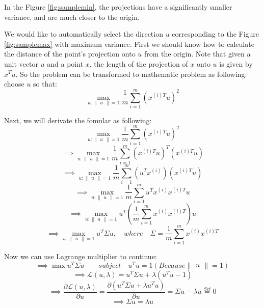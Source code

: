 \documentclass[a4paper]{article}
\begin{document}
In the Figure \ref{fig:samplemin}, the projections have a significantly smaller variance, and are much closer to the origin.

We would like to automatically select the direction $u$ corresponding to the Figure \ref{fig:samplemax} with maximum variance.  First we should know how to calculate the distance of the point's projection onto $u$ from the origin. Note that given a unit vector $u$ and a point $x$, the length of the projection of $x$ onto $u$ is given by $x^{T}u$. So the problem can be transformed to mathematic problem as following: choose $u$ so that:
$$
	\max_{u:\begin{Vmatrix}u\end{Vmatrix}=1} \frac{1}{m} \sum_{i=1}^{m}(x^{(i)T}u)^{2}
$$

Next, we will derivate the fomular as following:
$$
	\max_{u:\begin{Vmatrix}u\end{Vmatrix}=1} \frac{1}{m} \sum_{i=1}^{m}(x^{(i)T}u)^{2}
$$
$$
	\implies \max_{u:\begin{Vmatrix}u\end{Vmatrix}=1} \frac{1}{m} \sum_{i=1}^{m}(x^{(i)T}u)^{T}(x^{(i)T}u)
$$
$$
	\implies \max_{u:\begin{Vmatrix}u\end{Vmatrix}=1} \frac{1}{m} \sum_{i=1}^{m}(u^Tx^{(i)})(x^{(i)T}u)
$$
$$
	\implies \max_{u:\begin{Vmatrix}u\end{Vmatrix}=1} \frac{1}{m} \sum_{i=1}^{m}u^Tx^{(i)}x^{(i)T}u
$$
$$
	\implies \max_{u:\begin{Vmatrix}u\end{Vmatrix}=1} u^T (\frac{1}{m}\sum_{i=1}^{m}x^{(i)}x^{(i)T})u
$$
$$
	\implies \max_{u:\begin{Vmatrix}u\end{Vmatrix}=1} u^T \Sigma u, \quad where \quad \Sigma=\frac{1}{m}\sum_{i=1}^{m}x^{(i)}x^{(i)T}
$$

Now we can use Lagrange multiplier to continue: 
$$
	\implies \max u^T \Sigma u
   	\quad \quad subject\quad u^Tu = 1(Because \begin{Vmatrix}u\end{Vmatrix}=1)
$$
$$
	\implies \mathcal{L}(u,\lambda) = u^T \Sigma u + \lambda (u^Tu - 1)
$$
$$
	\implies \frac{\partial \mathcal{L}(u,\lambda)}{\partial u} = \frac{\partial(u^T\Sigma u+\lambda u^Tu)}{\partial u}
    = \Sigma u - \lambda u \overset{Set}{=} 0
$$
$$
	\implies \Sigma u = \lambda u
$$
\end{document}
